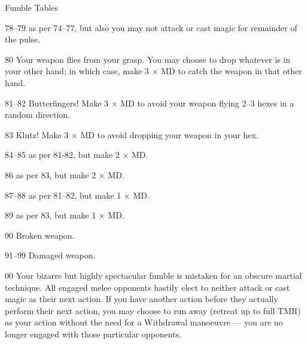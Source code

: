 \begin{Chapter}{Fumble Tables}
\begin{Description}
\item[78–79] as per 74–77, but also you may not attack or cast magic
  for remainder of the pulse.

\item[80] Your weapon flies from your grasp. You may choose to drop
  whatever is in your other hand; in which case, make 3 × MD to catch
  the weapon in that other hand.

\item[81–82] Butterfingers! Make 3 × MD to avoid your weapon flying
  2–3 hexes in a random direction.

\item[83] Klutz! Make 3 × MD to avoid dropping your weapon in your
  hex.

\item[84–85] as per 81-82, but make 2 × MD.

\item[86] as per 83, but make 2 × MD.

87–88  as per 81–82, but make 1 × MD. 

\item[89] as per 83, but make 1 × MD.

\item[90] Broken weapon.

\item[91–99] Damaged weapon.

\item[00] Your bizarre but highly spectacular fumble is mistaken for
  an obscure martial technique.  All engaged melee opponents hastily
  elect to neither attack or cast magic as their next action. If you
  have another action before they actually perform their next action,
  you may choose to run away (retreat up to full TMR) as your action
  without the need for a Withdrawal manoeuvre — you are no longer
  engaged with those particular opponents.

\end{Description}

\end{Chapter}
